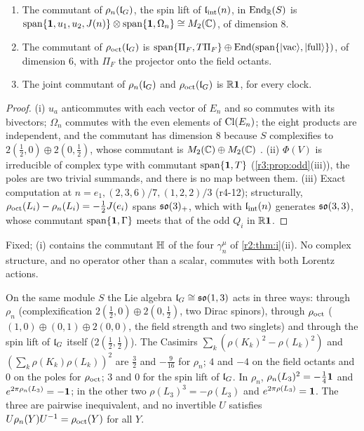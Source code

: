 \begin{proposition}[Commutants]
\label{r4:prop:comm}
\begin{enumerate}[label=(\roman*),leftmargin=2.2em]
\item The commutant of $\rho_n(\mathfrak l_G)$, the spin lift of $\mathfrak l_{\rm int}(n)$, in $\operatorname{End}_{\mathbb{R}}(S)$ is $\operatorname{span}\{\mathbf 1,u_1,u_2,J(n)\}\otimes\operatorname{span}\{\mathbf 1,\Omega_n\}\cong M_2(\mathbb{C})$,
of dimension $8$.
\item The commutant of $\rho_{\rm oct}(\mathfrak l_G)$ is $\operatorname{span}\{\Pi_F,T\Pi_F\}\oplus\operatorname{End}(\operatorname{span}\{|\mathrm{vac}\rangle,|\mathrm{full}\rangle\})$, of dimension $6$, with $\Pi_F$
the projector onto the field octants.
\item The joint commutant of $\rho_n(\mathfrak l_G)$ and $\rho_{\rm oct}(\mathfrak l_G)$ is $\mathbb{R}\mathbf 1$, for every clock.
\end{enumerate}
\end{proposition}

\begin{proof}
(i) $u_a$ anticommutes with each vector of $E_n$ and so commutes with its bivectors; $\Omega_n$ commutes with the even elements of $\mathrm{Cl}(E_n)$; the eight
products are independent, and the commutant has dimension $8$ because $S$ complexifies to $2(\tfrac12,0)\oplus2(0,\tfrac12)$, whose commutant is
$M_2(\mathbb{C})\oplus M_2(\mathbb{C})$ \cite{GoodmanWallach}. (ii) $\Phi(V)$ is irreducible of complex type with commutant $\operatorname{span}\{\mathbf 1,T\}$ (\cref{r3:prop:odd}(iii)), the poles are two
trivial summands, and there is no map between them. (iii) Exact computation at $n=e_1,(2,3,6)/7,(1,2,2)/3$ (r4-12); structurally, $\rho_{\rm oct}(L_i)-\rho_n(L_i)=-\tfrac12J(e_i)$
spans $\mathfrak{so}(3)_+$, which with $\mathfrak l_{\rm int}(n)$ generates $\mathfrak{so}(3,3)$, whose commutant $\operatorname{span}\{\mathbf 1,\Gamma\}$ meets that of the odd $Q_i$ in $\mathbb{R}\mathbf 1$.
\end{proof}

Fixed; (i) contains the commutant $\mathbb{H}$ of the four $\gamma^\mu_n$ of \cref{r2:thm:i}(ii). No complex structure, and no operator other than a scalar,
commutes with both Lorentz actions.

\begin{proposition}
\label{r4:prop:ineq}
On the same module $S$ the Lie algebra $\mathfrak l_G\cong\mathfrak{so}(1,3)$ acts in three ways: through $\rho_n$ (complexification $2(\tfrac12,0)\oplus2(0,\tfrac12)$, two
Dirac spinors), through $\rho_{\rm oct}$ ($(1,0)\oplus(0,1)\oplus2(0,0)$, the field strength and two singlets) and through the spin lift of $\mathfrak l_G$ itself
($2(\tfrac12,\tfrac12)$). The Casimirs $\sum_k(\rho(K_k)^2-\rho(L_k)^2)$ and $(\sum_k\rho(K_k)\rho(L_k))^2$ are $\tfrac32$ and $-\tfrac9{16}$ for $\rho_n$; $4$ and $-4$ on the field
octants and $0$ on the poles for $\rho_{\rm oct}$; $3$ and $0$ for the spin lift of $\mathfrak l_G$. In $\rho_n$, $\rho_n(L_3)^2=-\tfrac14\mathbf 1$ and $e^{2\pi\rho_n(L_3)}=-\mathbf 1$; in the other two
$\rho(L_3)^3=-\rho(L_3)$ and $e^{2\pi\rho(L_3)}=\mathbf 1$. The three are pairwise inequivalent, and no invertible $U$ satisfies $U\rho_n(Y)U^{-1}=\rho_{\rm oct}(Y)$
for all $Y$.
\end{proposition}

